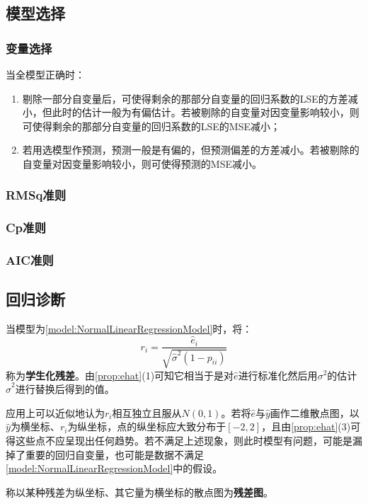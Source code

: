 \subsection{模型选择}
\subsubsection{变量选择}
\begin{theorem}
	当全模型正确时：
	\begin{enumerate}
		\item 剔除一部分自变量后，可使得剩余的那部分自变量的回归系数的LSE的方差减小，但此时的估计一般为有偏估计。若被剔除的自变量对因变量影响较小，则可使得剩余的那部分自变量的回归系数的LSE的MSE减小；
		\item 若用选模型作预测，预测一般是有偏的，但预测偏差的方差减小。若被剔除的自变量对因变量影响较小，则可使得预测的MSE减小。
	\end{enumerate}
\end{theorem}
\subsubsection{RMSq准则}
\subsubsection{Cp准则}
\subsubsection{AIC准则}

\subsection{回归诊断}
\begin{definition}
	当模型为\cref{model:NormalLinearRegressionModel}时，将：
	\begin{equation*}
		r_i=\frac{\hat{e}_i}{\sqrt{\hat{\sigma}^2(1-p_{ii})}}
	\end{equation*}
	称为\textbf{学生化残差}。由\cref{prop:ehat}(1)可知它相当于是对$\hat{e}$进行标准化然后用$\sigma^2$的估计$\hat{\sigma}^2$进行替换后得到的值。
\end{definition}
\begin{note}
	应用上可以近似地认为$r_i$相互独立且服从$N(0,1)$。若将$\hat{e}$与$\hat{y}$画作二维散点图，以$\hat{y}$为横坐标、$r_i$为纵坐标，点的纵坐标应大致分布于$[-2,2]$，且由\cref{prop:ehat}(3)可得这些点不应呈现出任何趋势。若不满足上述现象，则此时模型有问题，可能是漏掉了重要的回归自变量，也可能是数据不满足\cref{model:NormalLinearRegressionModel}中的假设。
\end{note}
\begin{definition}
	称以某种残差为纵坐标、其它量为横坐标的散点图为\textbf{残差图}。
\end{definition}

